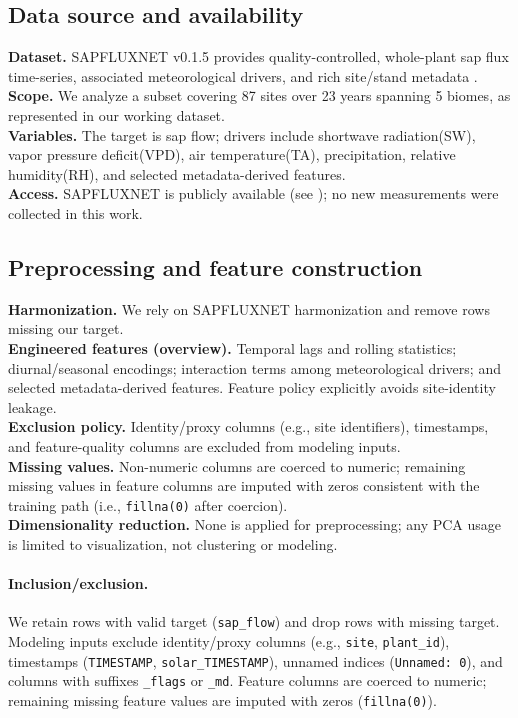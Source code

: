 \documentclass[graybox]{svmult}
\begin{document}
\subsection{Data source and availability}
\label{subsec:data_source}
\textbf{Dataset.} SAPFLUXNET v0.1.5 provides quality-controlled, whole-plant sap flux time-series, associated meteorological drivers, and rich site/stand metadata \cite{poyatos_global_2021}. \\
\textbf{Scope.} We analyze a subset covering 87 sites over 23 years spanning 5 biomes, as represented in our working dataset. \\
\textbf{Variables.} The target is sap flow; drivers include shortwave radiation(SW), vapor pressure deficit(VPD), air temperature(TA), precipitation, relative humidity(RH), and selected metadata-derived features. \\
\textbf{Access.} SAPFLUXNET is publicly available (see \cite{poyatos_global_2021}); no new measurements were collected in this work.

\subsection{Preprocessing and feature construction}
\label{subsec:preprocess}
\textbf{Harmonization.} We rely on SAPFLUXNET harmonization and remove rows missing our target. \\
\textbf{Engineered features (overview).} Temporal lags and rolling statistics; diurnal/seasonal encodings; interaction terms among meteorological drivers; and selected metadata-derived features. Feature policy explicitly avoids site-identity leakage. \\
\textbf{Exclusion policy.} Identity/proxy columns (e.g., site identifiers), timestamps, and feature-quality columns are excluded from modeling inputs. \\
\textbf{Missing values.} Non-numeric columns are coerced to numeric; remaining missing values in feature columns are imputed with zeros consistent with the training path (i.e., \texttt{fillna(0)} after coercion). \\
\textbf{Dimensionality reduction.} None is applied for preprocessing; any PCA usage is limited to visualization, not clustering or modeling.

\paragraph{Inclusion/exclusion.}
We retain rows with valid target (\texttt{sap\_flow}) and drop rows with missing target. Modeling inputs exclude identity/proxy columns (e.g., \texttt{site}, \texttt{plant\_id}), timestamps (\texttt{TIMESTAMP}, \texttt{solar\_TIMESTAMP}), unnamed indices (\texttt{Unnamed: 0}), and columns with suffixes \texttt{\_flags} or \texttt{\_md}. Feature columns are coerced to numeric; remaining missing feature values are imputed with zeros (\texttt{fillna(0)}).
\end{document}
